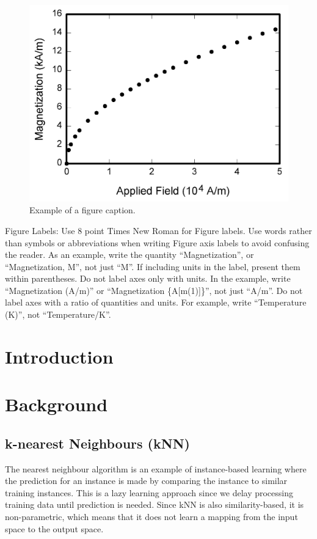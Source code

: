 \documentclass[conference]{IEEEtran}
\begin{document}
\begin{figure}[htbp]
\centerline{\includegraphics{fig1.png}}
\caption{Example of a figure caption.}
\label{fig}
\end{figure}

Figure Labels: Use 8 point Times New Roman for Figure labels. Use words 
rather than symbols or abbreviations when writing Figure axis labels to 
avoid confusing the reader. As an example, write the quantity 
``Magnetization'', or ``Magnetization, M'', not just ``M''. If including 
units in the label, present them within parentheses. Do not label axes only 
with units. In the example, write ``Magnetization (A/m)'' or ``Magnetization 
\{A[m(1)]\}'', not just ``A/m''. Do not label axes with a ratio of 
quantities and units. For example, write ``Temperature (K)'', not 
``Temperature/K''.

\section{Introduction}
\section{Background}

\subsection{k-nearest Neighbours (kNN)}
The nearest neighbour algorithm is an example of instance-based learning where the prediction for an instance is made by comparing the instance to similar training instances. This is a lazy learning approach since we delay processing training data until prediction is needed. Since kNN is also similarity-based, it is non-parametric, which means that it does not learn a mapping from the input space to the output space.
\end{document}

